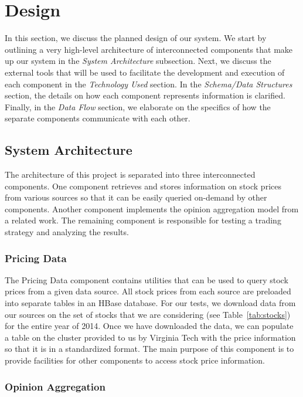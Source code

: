 
\section{Design}

In this section, we discuss the planned design of our system.
We start by outlining a very high-level architecture of interconnected components that make up our system in the \textit{System Architecture} subsection.
Next, we discuss the external tools that will be used to facilitate the development and execution of each component in the \textit{Technology Used} section.
In the \textit{Schema/Data Structures} section, the details on how each component represents information is clarified.
Finally, in the \textit{Data Flow} section, we elaborate on the specifics of how the separate components communicate with each other.

\subsection{System Architecture}

The architecture of this project is separated into three interconnected components.
One component retrieves and stores information on stock prices from various sources so that it can be easily queried on-demand by other components.
Another component implements the opinion aggregation model from a related work.
The remaining component is responsible for testing a trading strategy and analyzing the results.

\subsubsection{Pricing Data}

The Pricing Data component contains utilities that can be used to query stock prices from a given data source.
All stock prices from each source are preloaded into separate tables in an HBase \cite{hbase} database.
For our tests, we download data from our sources on the set of stocks that we are considering (see Table~\ref{tab:stocks}) for the entire year of 2014.
Once we have downloaded the data, we can populate a table on the cluster provided to us by Virginia Tech with the price information so that it is in a standardized format.
The main purpose of this component is to provide facilities for other components to access stock price information.

\subsubsection{Opinion Aggregation}

